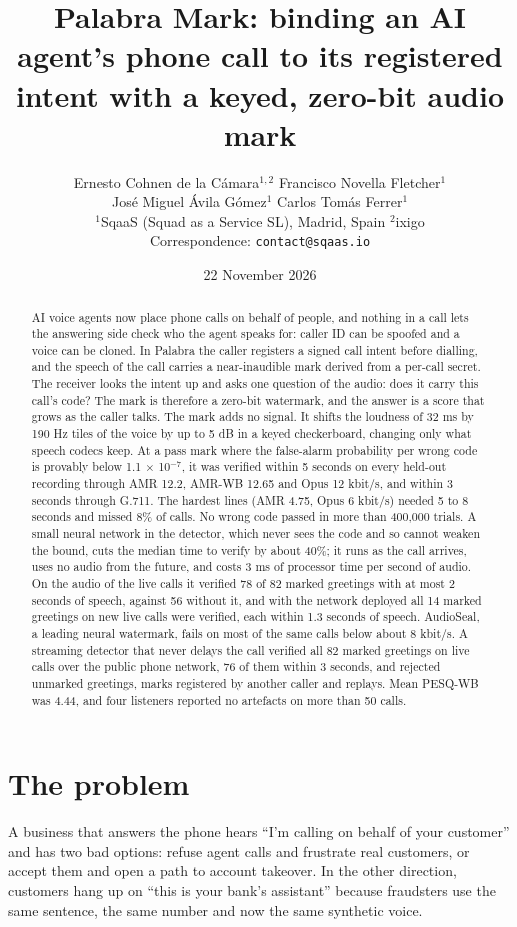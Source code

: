 \documentclass[10pt,a4paper]{article}
\title{Palabra Mark: binding an AI agent's phone call to its registered intent with a keyed, zero-bit audio mark}
\author{Ernesto Cohnen de la Cámara$^{1,2}$ \quad Francisco Novella Fletcher$^{1}$ \\[0.3em] José Miguel Ávila Gómez$^{1}$ \quad Carlos Tomás Ferrer$^{1}$ \\[0.8em]
{\normalsize $^{1}$SqaaS (Squad as a Service SL), Madrid, Spain \quad $^{2}$ixigo} \\[0.2em] {\normalsize Correspondence: \texttt{contact@sqaas.io}}}
\date{22 November 2026}
\begin{document}
\maketitle
\begin{abstract}
AI voice agents now place phone calls on behalf of people, and nothing
in a call lets the answering side check who the agent speaks for: caller
ID can be spoofed and a voice can be cloned. In Palabra the caller
registers a signed call intent before dialling, and the speech of the
call carries a near-inaudible mark derived from a per-call secret. The
receiver looks the intent up and asks one question of the audio: does it
carry this call's code? The mark is therefore a zero-bit watermark, and
the answer is a score that grows as the caller talks. The mark adds no
signal. It shifts the loudness of 32 ms by 190 Hz tiles of the voice by
up to 5 dB in a keyed checkerboard, changing only what speech codecs
keep. At a pass mark where the false-alarm probability per wrong code is
provably below 1.1 $\times$ 10$^{-7}$, it was verified within 5 seconds
on every held-out recording through AMR 12.2, AMR-WB 12.65 and Opus 12
kbit/s, and within 3 seconds through G.711. The hardest lines (AMR 4.75,
Opus 6 kbit/s) needed 5 to 8 seconds and missed 8\% of calls. No wrong
code passed in more than 400,000 trials. A small neural network in the
detector, which never sees the code and so cannot weaken the bound, cuts
the median time to verify by about 40\%; it runs as the call arrives,
uses no audio from the future, and costs 3 ms of processor time per
second of audio. On the audio of the live calls it verified 78 of 82
marked greetings with at most 2 seconds of speech, against 56 without
it, and with the network deployed all 14 marked greetings on new live
calls were verified, each within 1.3 seconds of speech. AudioSeal, a
leading neural watermark, fails on most of the same calls below about 8
kbit/s. A streaming detector that never delays the call verified all 82
marked greetings on live calls over the public phone network, 76 of them
within 3 seconds, and rejected unmarked greetings, marks registered by
another caller and replays. Mean PESQ-WB was 4.44, and four listeners
reported no artefacts on more than 50 calls.

\end{abstract}
\section{The problem}\label{s-1}

A business that answers the phone hears ``I'm calling on behalf of your customer'' and has two bad options: refuse agent calls and frustrate real customers, or accept them and open a path to account takeover. In the other direction, customers hang up on ``this is your bank's assistant'' because fraudsters use the same sentence, the same number and now the same synthetic voice.
\end{document}
